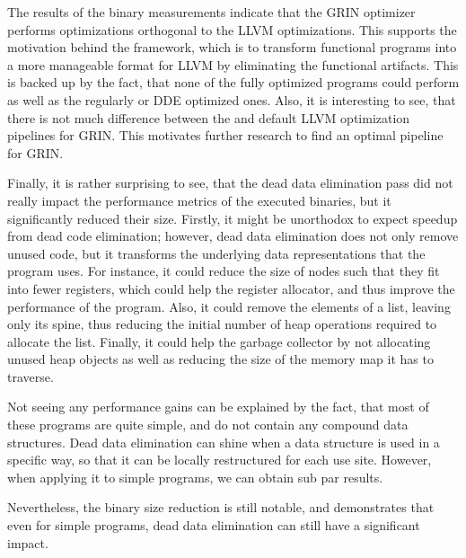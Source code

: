 \documentclass[main.tex]{subfiles}
\begin{document}
	The results of the binary measurements indicate that the GRIN optimizer performs optimizations orthogonal to the LLVM optimizations. This supports the motivation behind the framework, which is to transform functional programs into a more manageable format for LLVM by eliminating the functional artifacts. This is backed up by the fact, that none of the fully optimized  programs could perform as well as the regularly or DDE optimized ones. Also, it is interesting to see, that there is not much difference between the  and  default LLVM optimization pipelines for GRIN. This motivates further research to find an optimal pipeline for GRIN. 
	
	Finally, it is rather surprising to see, that the dead data elimination pass did not really impact the performance metrics of the executed binaries, but it significantly reduced their size. Firstly, it might be unorthodox to expect speedup from dead code elimination; however, dead data elimination does not only remove unused code, but it transforms the underlying data representations that the program uses. For instance, it could reduce the size of nodes such that they fit into fewer registers, which could help the register allocator, and thus improve the performance of the program. Also, it could remove the elements of a list, leaving only its spine, thus reducing the initial number of heap operations required to allocate the list. Finally, it could help the garbage collector by not allocating unused heap objects as well as reducing the size of the memory map it has to traverse.
	
	Not seeing any performance gains can be explained by the fact, that most of these programs are quite simple, and do not contain any compound data structures. Dead data elimination can shine when a data structure is used in a specific way, so that it can be locally restructured for each use site. However, when applying it to simple programs, we can obtain sub par results. 
	
	Nevertheless, the binary size reduction is still notable, and demonstrates that even for simple programs, dead data elimination can still have a significant impact.
\end{document}
